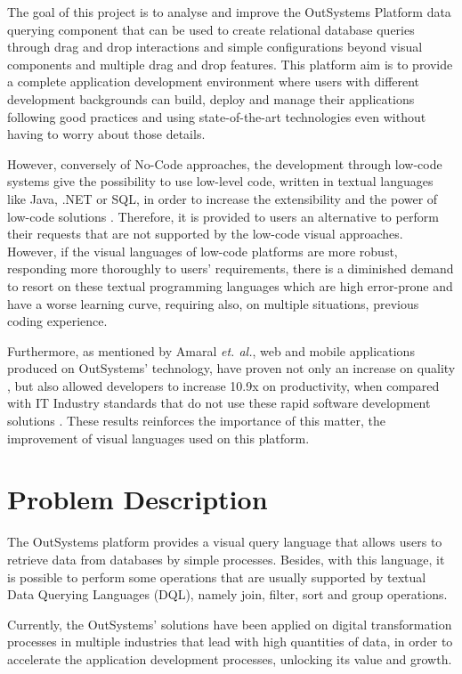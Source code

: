 The goal of this project is to analyse and improve the OutSystems Platform data querying component that can be used to create relational database queries through drag and drop interactions and simple configurations beyond visual components and multiple drag and drop features. This platform aim is to provide a complete application development environment where users with different development backgrounds can build, deploy and manage their applications following good practices and using state-of-the-art technologies even without having to worry about those details.

However, conversely of No-Code approaches, the development through low-code systems give the possibility to use low-level code, written in textual languages like Java, .NET or SQL, in order to increase the extensibility and the power of low-code solutions \cite{outsystems_lowcodeVsNocode}. Therefore, it is provided to users an alternative to perform their requests that are not supported by the low-code visual approaches. However, if the visual languages of low-code platforms are more robust, responding more thoroughly to users’ requirements, there is a diminished demand to resort on these textual programming languages which are high error-prone and have a worse learning curve, requiring also, on multiple situations, previous coding experience.

Furthermore, as mentioned by  Amaral \textit{et. al.}, web and mobile applications produced on OutSystems’ technology, have proven not only an increase on quality \cite{improvingTheDeveloperExperienceWithALowCodeProcessModellingLanguage}, but also allowed developers to increase 10.9x on productivity, when compared with  IT Industry standards that do not use these rapid software development solutions \cite{outByNumbers2013}. These results reinforces the importance of this matter, the improvement of visual languages used on this platform.


\section{Problem Description}
\label{sec:problem_description}
The OutSystems platform provides a visual query language that allows users to retrieve data from databases by simple processes. Besides, with this language, it is possible to perform some operations that are usually supported by textual Data Querying Languages (DQL), namely join, filter, sort and group operations.

Currently, the OutSystems’ solutions have been applied on digital transformation processes in multiple industries that lead with high quantities of data, in order to accelerate the application development processes, unlocking its value and growth.

